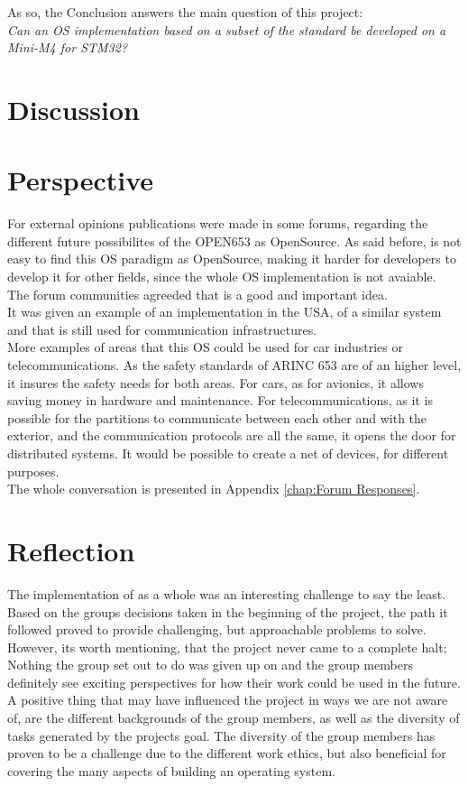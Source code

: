 As so, the Conclusion answers the main question of this project:\\
\textit{Can an OS implementation based on a subset of the \arinc{} standard be
developed on a Mini-M4 for STM32?}
\clearpage

\section{Discussion}

\section{Perspective}
For external opinions publications were made in some forums, regarding the different future possibilites of the OPEN653 as OpenSource. As said before, is not easy to find this OS paradigm as OpenSource, making it harder for developers to develop it for other fields, since the whole OS implementation is not avaiable. The forum communities agreeded that is a good and important idea.\\
It was given an example of an implementation in the USA, of a similar system and that is still used for
communication infrastructures.\\
More examples of areas that this OS could be used for car industries or telecommunications.
As the safety standards of ARINC 653 are of an higher level, it insures the safety needs for both areas. For cars, as for avionics, it allows saving money in hardware and maintenance. For telecommunications, as it is possible for the partitions to communicate between each other and with the exterior, and the communication protocols are all the same, it opens the door for distributed systems. It would be possible to create a net of devices, for different purposes.\\
The whole conversation is presented in Appendix \ref{chap:Forum Responses}.

\section{Reflection}
The implementation of \OSname{} as a whole was an interesting challenge
to say the least. Based on the group\textquotesingle s decisions taken in the beginning 
of the project, the path it followed proved to provide challenging, but
approachable problems to solve. However, its worth mentioning,
that the project never came to a complete halt;
Nothing the group set out to do was given up on and the group
members definitely see exciting perspectives for how their work could be
used in the future.\\
A positive thing that may have influenced the project in ways we are
not aware of, are the different backgrounds of the group members, as well as
the diversity of tasks generated by the project\textquotesingle s goal.
The diversity of the group members has proven to be a challenge due to the different work ethics,
but also beneficial for covering the many aspects of building an operating system.
